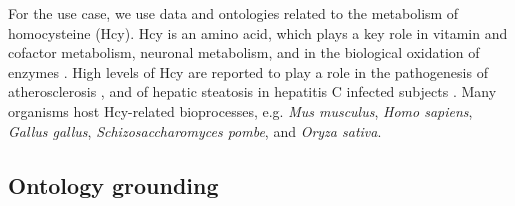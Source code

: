 For the use  case,  we use data  and ontologies  related to the metabolism of homocysteine (Hcy). Hcy is an amino acid, which plays  a key role in vitamin and cofactor  metabolism,  neuronal metabolism,  and in the biological oxidation of enzymes \citep{Selhub1999}. 
%
High levels of Hcy are reported to play a role in the pathogenesis of atherosclerosis \citep{Muniz2006}, and of hepatic steatosis in hepatitis C infected subjects \citep{Siqueira2011b}. Many organisms host Hcy-related bioprocesses, e.g. \textit{Mus musculus}, \textit{Homo sapiens}, \textit{Gallus gallus}, \textit{Schizosaccharomyces pombe}, and \textit{Oryza sativa}.

\subsection{Ontology grounding}

